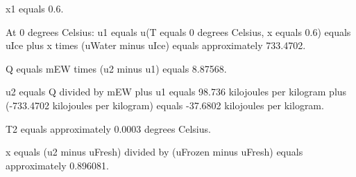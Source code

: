 x1 equals 0.6.  

At 0 degrees Celsius:  
u1 equals u(T equals 0 degrees Celsius, x equals 0.6) equals uIce plus x times (uWater minus uIce) equals approximately 733.4702.  

Q equals mEW times (u2 minus u1) equals 8.87568.  

u2 equals Q divided by mEW plus u1 equals 98.736 kilojoules per kilogram plus (-733.4702 kilojoules per kilogram) equals -37.6802 kilojoules per kilogram.  

T2 equals approximately 0.0003 degrees Celsius.  

x equals (u2 minus uFresh) divided by (uFrozen minus uFresh) equals approximately 0.896081.